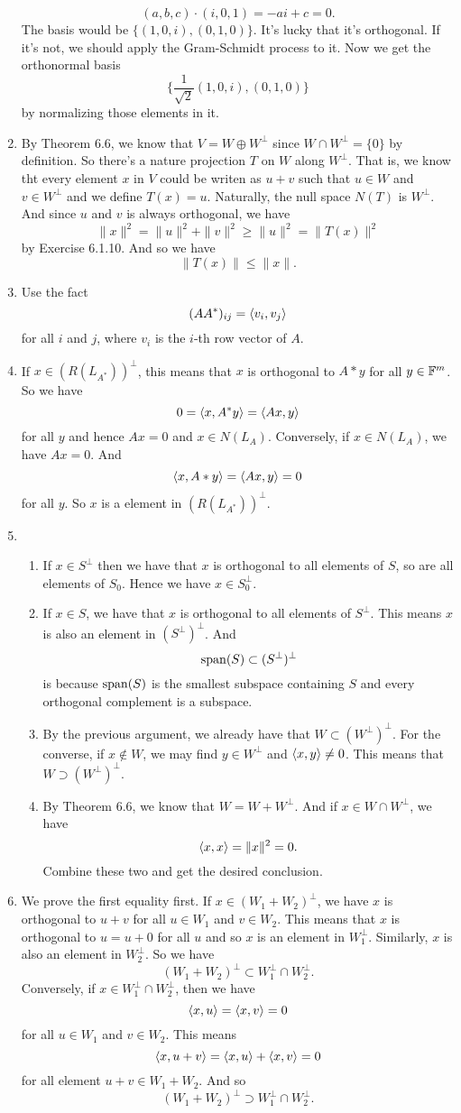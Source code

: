 \begin{enumerate}
\[(a,b,c)\cdot (i,0,1)=-ai+c=0.\]
The basis would be $\{(1,0,i),(0,1,0)\}$. It's lucky that it's orthogonal. If it's not, we should apply the Gram-Schmidt process to it. Now we get the orthonormal basis 
\[\{\frac{1}{\sqrt{2}}(1,0,i),(0,1,0)\}\]
by normalizing those elements in it.
\item By Theorem 6.6, we know that $V=W\oplus W^{\perp}$ since $W\cap W^{\perp}=\{0\}$ by definition. So there's a nature projection $T$ on $W$ along $W^{\perp}$. That is, we know tht every element $x$ in $V$ could be writen as $u+v$ such that $u\in W$ and $v\in W^{\perp}$ and we define $T(x)=u$. Naturally, the null space $N(T)$ is $W^{\perp}$. And since $u$ and $v$ is always orthogonal, we have 
\[\|x\|^2=\|u\|^2+\|v\|^2\geq \|u\|^2=\|T(x)\|^2\]
by Exercise 6.1.10. And so we have 
\[\|T(x)\|\leq \|x\|.\]
\item Use the fact 
\[(AA^*)_{ij}=\lag v_i,v_j\rag \]
for all $i$ and $j$, where $v_i$ is the $i$-th row vector of $A$.
\item If $x\in (R(L_{A^*}))^{\perp}$, this means that $x$ is orthogonal to $A*y$ for all $y\in \F^m$. So we have 
\[0=\lag x,A^*y\rag =\lag Ax,y\rag \]
for all $y$ and hence $Ax=0$ and $x\in N(L_A)$. Conversely, if $x\in N(L_A)$, we have $Ax=0$. And 
\[\lag x,A*y\rag =\lag Ax,y\rag =0\]
for all $y$. So $x$ is a element in $(R(L_{A^*}))^{\perp}$.
\item \begin{enumerate}
\item If $x\in S^{\perp}$ then we have that $x$ is orthogonal to all elements of $S$, so are all elements of $S_0$. Hence we have $x\in S_0^{\perp}$.
\item If $x\in S$, we have that $x$ is orthogonal to all elements of $S^{\perp}$. This means $x$ is also an element in $(S^{\perp})^{\perp}$. And 
\[\sp(S)\subset (S^{\perp})^{\perp}\]
is because $\sp(S)$ is the smallest subspace containing $S$ and every orthogonal complement is a subspace.
\item By the previous argument, we already have that $W\subset (W^{\perp})^{\perp}$. For the converse, if $x\notin W$, we may find $y\in W^{\perp}$ and $\lag x,y\rag \neq 0$. This means that $W\supset (W^{\perp})^{\perp}$.
\item By Theorem 6.6, we know that $W=W+W^{\perp}$. And if $x\in W\cap W^{\perp}$, we have 
\[\lag x,x\rag =\|x\|^2=0.\]
Combine these two and get the desired conclusion.
\end{enumerate}
\item We prove the first equality first.  If $x\in (W_1+W_2)^{\perp}$, we have $x$ is orthogonal to $u+v$ for all $u\in W_1$ and $v\in W_2$. This means that $x$ is orthogonal to $u=u+0$ for all $u$ and so $x$ is an element in $W_1^{\perp}$. Similarly, $x$ is also an element in $W_2^{\perp}$. So we have 
\[(W_1+W_2)^{\perp}\subset W_1^\perp \cap W_2^\perp.\]
Conversely, if $x\in W_1^{\perp}\cap W_2^{\perp}$, then we have 
\[\lag x,u\rag =\lag x,v\rag =0\]
for all $u\in W_1$ and $v\in W_2$. This means 
\[\lag x,u+v\rag =\lag x,u\rag +\lag x,v\rag =0\]
for all element $u+v\in W_1+W_2$. And so 
\[(W_1+W_2)^{\perp}\supset W_1^\perp \cap W_2^\perp.\]


\end{enumerate}
